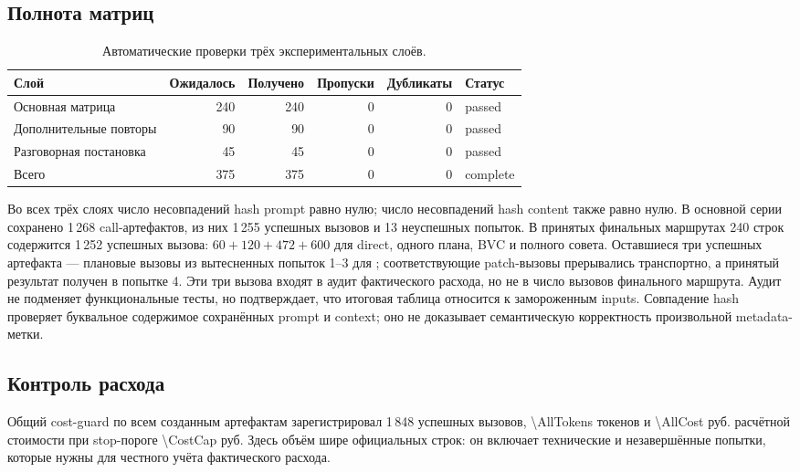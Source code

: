 \documentclass[11pt]{article}
\begin{document}
\subsection{Полнота матриц}

\begin{table}[H]
\centering
\caption{Автоматические проверки трёх экспериментальных слоёв.}
\label{tab:integrity}
\begin{tabular}{@{}lrrrrl@{}}
\toprule
Слой & Ожидалось & Получено & Пропуски & Дубликаты & Статус\\
\midrule
Основная матрица & 240 & 240 & 0 & 0 & passed\\
Дополнительные повторы & 90 & 90 & 0 & 0 & passed\\
Разговорная постановка & 45 & 45 & 0 & 0 & passed\\
\midrule
Всего & 375 & 375 & 0 & 0 & complete\\
\bottomrule
\end{tabular}
\end{table}

Во всех трёх слоях число несовпадений hash prompt равно нулю; число
несовпадений hash content также равно нулю. В основной серии сохранено
1\,268 call-артефактов, из них 1\,255 успешных вызовов и 13 неуспешных
попыток. В принятых финальных маршрутах 240 строк содержится 1\,252 успешных
вызова: \(60+120+472+600\) для direct, одного плана, BVC и полного совета.
Оставшиеся три успешных артефакта --- плановые вызовы из вытесненных попыток
1--3 для ; соответствующие patch-вызовы
прерывались транспортно, а принятый результат получен в попытке 4. Эти три
вызова входят в аудит фактического расхода, но не в число вызовов финального
маршрута. Аудит не подменяет функциональные тесты, но подтверждает, что
итоговая таблица относится к замороженным inputs. Совпадение hash проверяет
буквальное содержимое сохранённых prompt и context; оно не доказывает
семантическую корректность произвольной metadata-метки.

\subsection{Контроль расхода}

Общий cost-guard по всем созданным артефактам зарегистрировал 1\,848
успешных вызовов, \num{\AllTokens} токенов и \num{\AllCost} руб.
расчётной стоимости при stop-пороге \num{\CostCap} руб. Здесь объём шире
\NAllRuns{} официальных строк: он включает технические и незавершённые
попытки, которые нужны для честного учёта фактического расхода.
\end{document}

